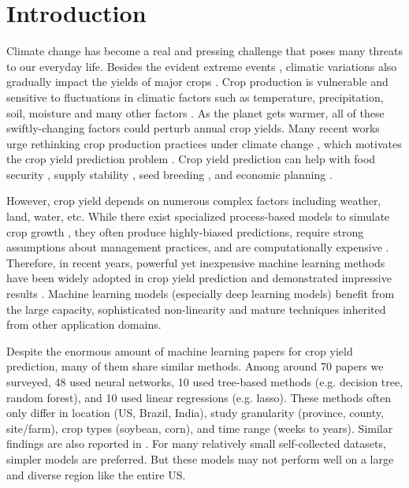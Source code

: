 \section{Introduction}

Climate change \cite{houghton1990climate} has become a real and pressing challenge that poses many threats to our everyday life. Besides the evident extreme events \cite{trenberth2015attribution}, climatic variations also gradually impact the yields of major crops \cite{zhao2017temperature}. Crop production is  vulnerable and sensitive to fluctuations in climatic factors such as temperature, precipitation, soil, moisture and many other factors \cite{ortiz2018growing}. As the planet gets warmer, all of these swiftly-changing factors could perturb annual crop yields. Many recent works urge rethinking crop production practices under climate change \cite{reynolds2010adapting,raza2019impact}, which motivates the crop yield prediction problem \cite{van2020crop}. Crop yield prediction can help with food security \cite{shukla2019climate}, supply stability \cite{garrett2013land}, seed breeding \cite{ansarifar2020performance}, and economic planning \cite{horie1992yield}.

However, crop yield depends on numerous complex factors including weather, land, water, etc. While there exist specialized process-based models to simulate crop growth \cite{shahhosseini2021coupling}, they often produce highly-biased predictions, require strong assumptions about management practices, and are computationally expensive \cite{leng2020predicting}.
Therefore, in recent years, powerful yet inexpensive machine learning methods have been widely adopted in crop yield prediction and demonstrated impressive results \cite{romero2013using, dahikar2014agricultural, marko2016soybean, you2017deep, khaki2020cnn, khaki2020predicting}. Machine learning models (especially deep learning models) benefit from the large capacity, sophisticated non-linearity and mature techniques inherited from other application domains.

Despite the enormous amount of machine learning papers for crop yield prediction, many of them share similar methods. Among around 70 papers we surveyed, 48 used neural networks, 10 used tree-based methods (e.g. decision tree, random forest), and 10 used linear regressions (e.g. lasso). These methods often only differ in location (US, Brazil, India), study granularity (province, county, site/farm), crop types (soybean, corn), and time range (weeks to years). Similar findings are also reported in \cite{van2020crop}. 
For many relatively small self-collected datasets, simpler models are preferred. But these models may not perform well on a large and diverse region like the entire US.

